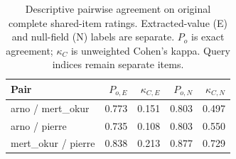\begin{table}[t]
\centering
\caption{Descriptive pairwise agreement on original complete shared-item ratings. Extracted-value (E) and null-field (N) labels are separate. $P_o$ is exact agreement; $\kappa_C$ is unweighted Cohen's kappa. Query indices remain separate items.}
\begin{tabular}{lrrrr}
\toprule
Pair & $P_{o,E}$ & $\kappa_{C,E}$ & $P_{o,N}$ & $\kappa_{C,N}$ \\
\midrule
arno / mert\_okur & 0.773 & 0.151 & 0.803 & 0.497 \\
arno / pierre & 0.735 & 0.108 & 0.803 & 0.550 \\
mert\_okur / pierre & 0.838 & 0.213 & 0.877 & 0.729 \\
\bottomrule
\end{tabular}
\label{tab:validation-pairwise}
\end{table}
